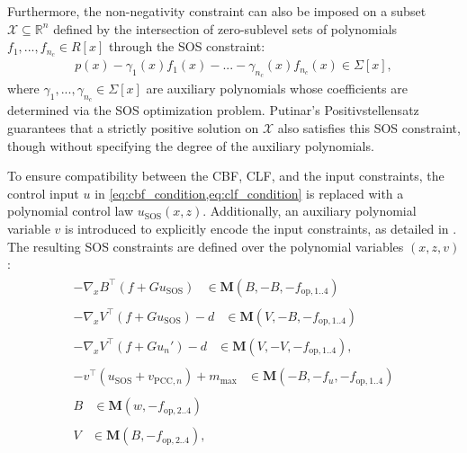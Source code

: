 \documentclass[lettersize,journal]{IEEEtran}
\newcommand{\R}{\mathbb{R}}
\begin{document}
Furthermore, the non-negativity constraint can also be imposed on a subset $\mathcal X \subseteq \R^n$ defined by the intersection of zero-sublevel sets of polynomials $f_1, ..., f_{n_c} \in R[x]$ through the SOS constraint:
\begin{align*}
   p(x) - \gamma_1(x) f_1(x) - ... - \gamma_{n_c}(x) f_{n_c}(x) \in \Sigma[x],
\end{align*}
where $\gamma_1, ..., \gamma_{n_c} \in \Sigma[x]$ are auxiliary polynomials whose coefficients are determined via the SOS optimization problem.
Putinar's Positivstellensatz guarantees that a strictly positive solution on $\mathcal X$ also satisfies this SOS constraint, though without specifying the degree of the auxiliary polynomials.


To ensure compatibility between the CBF, CLF, and the input constraints, the control input $u$ in \cref{eq:cbf_condition,eq:clf_condition} is replaced with a polynomial control law $u_\mathrm{SOS}(x,z)$.
Additionally, an auxiliary polynomial variable $v$ is introduced to explicitly encode the input constraints, as detailed in \cite{schneeberger2024advanced}.
The resulting SOS constraints are defined over the polynomial variables $(x, z, v)$:
\begin{subequations} \label{eq:sos_constr_ineq}
   \begin{align}
      \begin{split} \label{eq:sos_constr_ineq_cbf}
         -\nabla_x B^\top \left ( f + G u_\mathrm{SOS} \right ) &\in \textbf{M}(B, -B, -f_{\mathrm{op}, 1 .. 4}) 
      \end{split} \\
      \begin{split} \label{eq:sos_constr_ineq_clf}
         -\nabla_x V^\top \left ( f + G u_\mathrm{SOS} \right ) - d &\in \textbf{M}(V, -B, -f_{\mathrm{op}, 1 .. 4}) 
      \end{split} \\
      \begin{split} \label{eq:sos_constr_ineq_nom}
         -\nabla_x V^\top \left ( f + G u_{n}' \right ) - d &\in \textbf{M}(V, -V, -f_{\mathrm{op}, 1 .. 4}),
      \end{split} \\
      \begin{split}
         -v^\top (u_\mathrm{SOS} + v_{\text{PCC},n}) + m_\text{max} & \in \textbf{M}(-B, -f_u, -f_{\mathrm{op}, 1 .. 4})
      \end{split} \\
      \begin{split}
         B & \in \textbf{M}(w, -f_{\mathrm{op}, 2 .. 4})
      \end{split}\\
      \begin{split}
         V & \in \textbf{M}(B, -f_{\mathrm{op}, 2 .. 4}),
      \end{split}
   \end{align}
\end{subequations}
\end{document}
